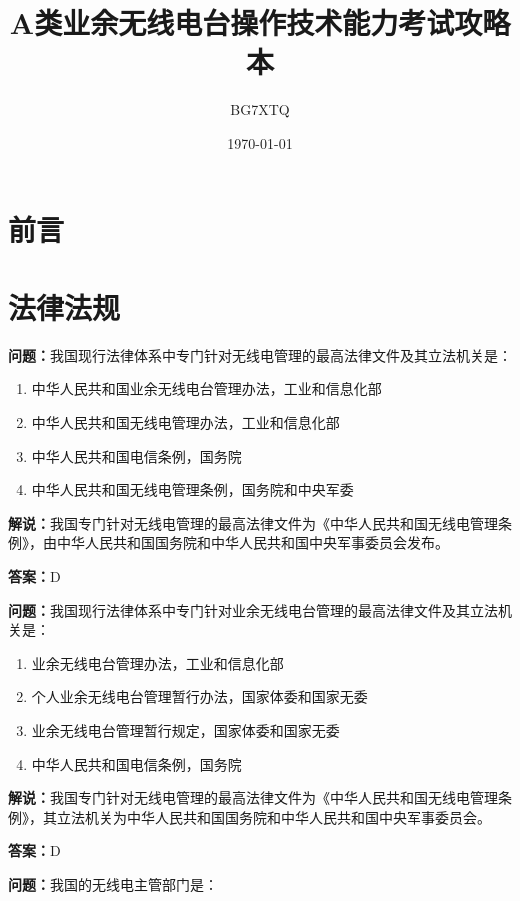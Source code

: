 \documentclass[UTF8]{ctexbook}
\title{A类业余无线电台操作技术能力考试攻略本}%
\author{BG7XTQ}%
\date{\today}%
\begin{document}

\maketitle%

\chapter*{前言}

\chapter{法律法规}

\textbf{问题：}我国现行法律体系中专门针对无线电管理的最高法律文件及其立法机关是：

\begin{enumerate}[label=\Alph*), leftmargin=3em]
  \item 中华人民共和国业余无线电台管理办法，工业和信息化部
  \item 中华人民共和国无线电管理办法，工业和信息化部
  \item 中华人民共和国电信条例，国务院
  \item 中华人民共和国无线电管理条例，国务院和中央军委
\end{enumerate}

\textbf{解说：}我国专门针对无线电管理的最高法律文件为《中华人民共和国无线电管理条例》，由中华人民共和国国务院和中华人民共和国中央军事委员会发布。

\textbf{答案：}D

\textbf{问题：}我国现行法律体系中专门针对业余无线电台管理的最高法律文件及其立法机关是：

\begin{enumerate}[label=\Alph*), leftmargin=3em]
  \item 业余无线电台管理办法，工业和信息化部
  \item 个人业余无线电台管理暂行办法，国家体委和国家无委
  \item 业余无线电台管理暂行规定，国家体委和国家无委
  \item 中华人民共和国电信条例，国务院
\end{enumerate}

\textbf{解说：}我国专门针对无线电管理的最高法律文件为《中华人民共和国无线电管理条例》，其立法机关为中华人民共和国国务院和中华人民共和国中央军事委员会。

\textbf{答案：}D

\textbf{问题：}我国的无线电主管部门是：
\end{document}
